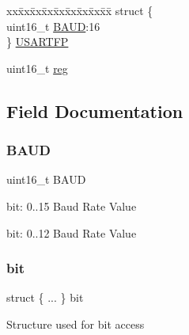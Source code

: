 \begin{DoxyCompactItemize}
\begin{tabbing}
\end{tabbing}\item 
\begin{tabbing}
xx\=xx\=xx\=xx\=xx\=xx\=xx\=xx\=xx\=\kill
struct \{\\
\>uint16\_t \mbox{\hyperlink{union_s_e_r_c_o_m___u_s_a_r_t___b_a_u_d___type_a4e98caf098e8b0e2afbb35aa81e03f6a}{BAUD}}:16\\
\} \mbox{\hyperlink{union_s_e_r_c_o_m___u_s_a_r_t___b_a_u_d___type_a16793451f0abc7edc85fa1705905d4dd}{USARTFP}}\\

\end{tabbing}\item 
uint16\+\_\+t \mbox{\hyperlink{union_s_e_r_c_o_m___u_s_a_r_t___b_a_u_d___type_a11760f5020019f4aa8cb02e694f7cc44}{reg}}
\end{DoxyCompactItemize}


\subsection{Field Documentation}
\mbox{\label{union_s_e_r_c_o_m___u_s_a_r_t___b_a_u_d___type_a4e98caf098e8b0e2afbb35aa81e03f6a}} 
\subsubsection{\texorpdfstring{BAUD}{BAUD}}
{\footnotesize\ttfamily uint16\+\_\+t B\+A\+UD}

bit\+: 0..15 Baud Rate Value

bit\+: 0..12 Baud Rate Value \mbox{\label{union_s_e_r_c_o_m___u_s_a_r_t___b_a_u_d___type_a70d99152e7a87b212ff5f67996ab0d4c}} 
\subsubsection{\texorpdfstring{bit}{bit}}
{\footnotesize\ttfamily struct \{ ... \}   bit}

Structure used for bit access \mbox{\label{union_s_e_r_c_o_m___u_s_a_r_t___b_a_u_d___type_afc8e941969959ac8ef02b02dbc50c9a7}} 
